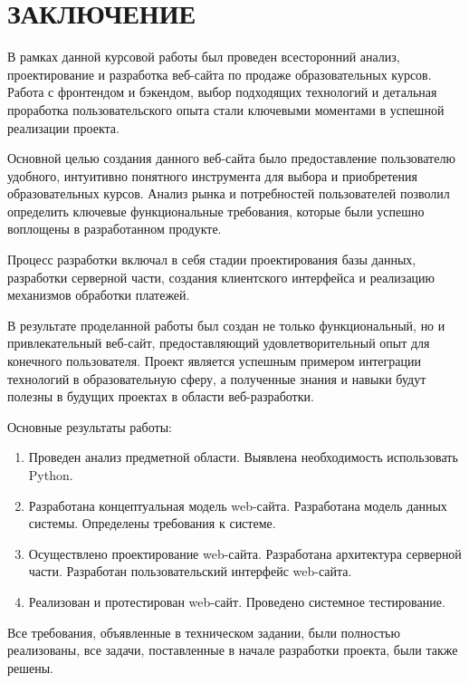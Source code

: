 \section*{ЗАКЛЮЧЕНИЕ}

В рамках данной курсовой работы был проведен всесторонний анализ, проектирование и разработка веб-сайта по продаже образовательных курсов. Работа с фронтендом и бэкендом, выбор подходящих технологий и детальная проработка пользовательского опыта стали ключевыми моментами в успешной реализации проекта.

Основной целью создания данного веб-сайта было предоставление пользователю удобного, интуитивно понятного инструмента для выбора и приобретения образовательных курсов. Анализ рынка и потребностей пользователей позволил определить ключевые функциональные требования, которые были успешно воплощены в разработанном продукте.

Процесс разработки включал в себя стадии проектирования базы данных, разработки серверной части, создания клиентского интерфейса и реализацию механизмов обработки платежей.

В результате проделанной работы был создан не только функциональный, но и привлекательный веб-сайт, предоставляющий удовлетворительный опыт для конечного пользователя. Проект является успешным примером интеграции технологий в образовательную сферу, а полученные знания и навыки будут полезны в будущих проектах в области веб-разработки.

Основные результаты работы:

\begin{enumerate}
\item Проведен анализ предметной области. Выявлена необходимость использовать Python.
\item Разработана концептуальная модель web-сайта. Разработана модель данных системы. Определены требования к системе.
\item Осуществлено проектирование web-сайта. Разработана архитектура серверной части. Разработан пользовательский интерфейс web-сайта.
\item Реализован и протестирован web-сайт. Проведено системное тестирование.
\end{enumerate}

Все требования, объявленные в техническом задании, были полностью реализованы, все задачи, поставленные в начале разработки проекта, были также решены.


